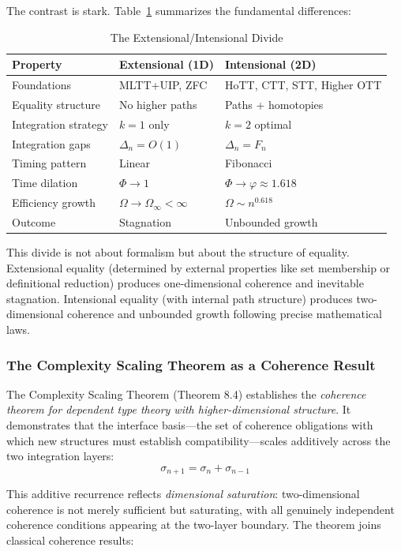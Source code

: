 \documentclass[11pt]{article}
\theoremstyle{definition}
\theoremstyle{remark}
\begin{document}
The contrast is stark. Table~\ref{tab:divide} summarizes the fundamental differences:

\begin{table}[h]
\centering
\caption{The Extensional/Intensional Divide}
\label{tab:divide}
\begin{tabular}{lll}
\hline
\textbf{Property} & \textbf{Extensional (1D)} & \textbf{Intensional (2D)} \\
\hline
Foundations & MLTT+UIP, ZFC & HoTT, CTT, STT, Higher OTT \\
Equality structure & No higher paths & Paths + homotopies \\
Integration strategy & $k = 1$ only & $k = 2$ optimal \\
Integration gaps & $\Delta_n = O(1)$ & $\Delta_n = F_n$ \\
Timing pattern & Linear & Fibonacci \\
Time dilation & $\Phi \to 1$ & $\Phi \to \varphi \approx 1.618$ \\
Efficiency growth & $\Omega \to \Omega_\infty < \infty$ & $\Omega \sim n^{0.618}$ \\
Outcome & Stagnation & Unbounded growth \\
\hline
\end{tabular}
\end{table}

This divide is not about formalism but about the structure of equality. Extensional equality
(determined by external properties like set membership or definitional reduction) produces one-dimensional coherence and inevitable stagnation. Intensional equality (with internal path structure)
produces two-dimensional coherence and unbounded growth following precise mathematical laws.

\subsubsection*{The Complexity Scaling Theorem as a Coherence Result}

The Complexity Scaling Theorem (Theorem 8.4) establishes the \emph{coherence theorem for dependent type theory with higher-dimensional structure}. It demonstrates that the interface
basis---the set of coherence obligations with which new structures must establish compatibility---scales
additively across the two integration layers:
\[
\sigma_{n+1} = \sigma_n + \sigma_{n-1}
\]

This additive recurrence reflects \emph{dimensional saturation}: two-dimensional coherence is not merely
sufficient but saturating, with all genuinely independent coherence conditions appearing at the
two-layer boundary. The theorem joins classical coherence results:
\end{document}
